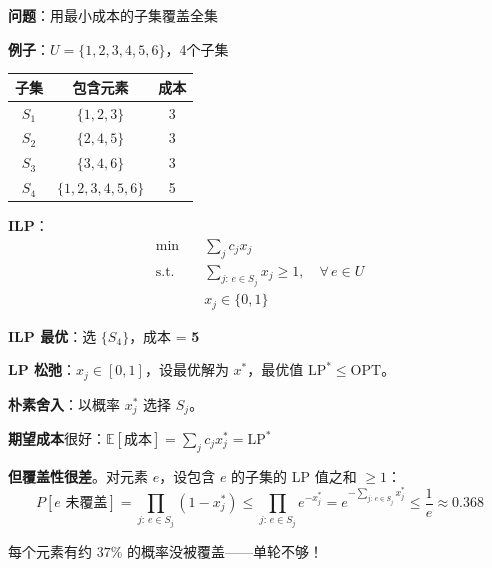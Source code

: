 \documentclass[12pt, a4paper]{ctexart}
\begin{document}
\begin{blackboard}
\textbf{问题}：用最小成本的子集覆盖全集

\textbf{例子}：$U = \{1, 2, 3, 4, 5, 6\}$，4个子集

\begin{center}
\begin{tabular}{c|c|c}
子集 & 包含元素 & 成本 \\
\hline
$S_1$ & $\{1, 2, 3\}$ & 3 \\
$S_2$ & $\{2, 4, 5\}$ & 3 \\
$S_3$ & $\{3, 4, 6\}$ & 3 \\
$S_4$ & $\{1, 2, 3, 4, 5, 6\}$ & 5
\end{tabular}
\end{center}

\textbf{ILP}：
\begin{align*}
\min \quad & \sum_j c_j x_j \\
\text{s.t.} \quad & \sum_{j:\, e \in S_j} x_j \geq 1, \quad \forall\, e \in U \\
& x_j \in \{0, 1\}
\end{align*}

\textbf{ILP 最优}：选 $\{S_4\}$，成本 = \textbf{5}

\end{blackboard}

\begin{blackboard}

\textbf{LP 松弛}：$x_j \in [0, 1]$，设最优解为 $x^*$，最优值 $\text{LP}^* \leq \text{OPT}$。

\textbf{朴素舍入}：以概率 $x_j^*$ 选择 $S_j$。

\textbf{期望成本}很好：$\mathbb{E}[\text{成本}] = \sum_j c_j x_j^* = \text{LP}^*$

\textbf{但覆盖性很差}。对元素 $e$，设包含 $e$ 的子集的 LP 值之和 $\geq 1$：
\[
P[e \text{ 未覆盖}] = \prod_{j:\, e\in S_j} (1 - x_j^*) \leq \prod_{j:\, e\in S_j} e^{-x_j^*} = e^{-\sum_{j:\,e\in S_j} x_j^*} \leq \frac{1}{e} \approx 0.368
\]

每个元素有约 $37\%$ 的概率没被覆盖——单轮不够！

\end{blackboard}
\end{document}
